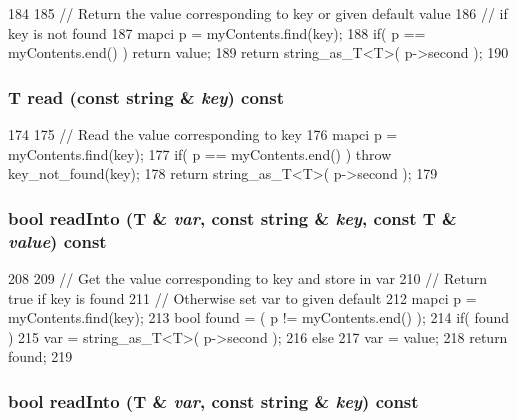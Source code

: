 \begin{DoxyCode}
184 {
185         // Return the value corresponding to key or given default value
186         // if key is not found
187         mapci p = myContents.find(key);
188         if( p == myContents.end() ) return value;
189         return string_as_T<T>( p->second );
190 }
\end{DoxyCode}
\hypertarget{classConfigFile_a86e0a00c9c37c874780c96de72b10dbe}{
\subsubsection[{read}]{\setlength{\rightskip}{0pt plus 5cm}T read (const string \& {\em key}) const}}
\label{classConfigFile_a86e0a00c9c37c874780c96de72b10dbe}



\begin{DoxyCode}
174 {
175         // Read the value corresponding to key
176         mapci p = myContents.find(key);
177         if( p == myContents.end() ) throw key_not_found(key);
178         return string_as_T<T>( p->second );
179 }
\end{DoxyCode}
\hypertarget{classConfigFile_a327741b7d63a05fb0d72b7a1b327f1a7}{
\subsubsection[{readInto}]{\setlength{\rightskip}{0pt plus 5cm}bool readInto (T \& {\em var}, \/  const string \& {\em key}, \/  const T \& {\em value}) const}}
\label{classConfigFile_a327741b7d63a05fb0d72b7a1b327f1a7}



\begin{DoxyCode}
208 {
209         // Get the value corresponding to key and store in var
210         // Return true if key is found
211         // Otherwise set var to given default
212         mapci p = myContents.find(key);
213         bool found = ( p != myContents.end() );
214         if( found )
215                 var = string_as_T<T>( p->second );
216         else
217                 var = value;
218         return found;
219 }
\end{DoxyCode}
\hypertarget{classConfigFile_ab78f330f4639ddc70bfcff5f84e24dbd}{
\subsubsection[{readInto}]{\setlength{\rightskip}{0pt plus 5cm}bool readInto (T \& {\em var}, \/  const string \& {\em key}) const}}
\label{classConfigFile_ab78f330f4639ddc70bfcff5f84e24dbd}



